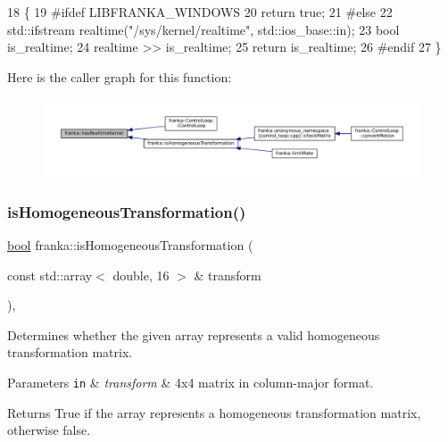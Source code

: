 \begin{DoxyCode}
18                          \{
19 \textcolor{preprocessor}{#ifdef LIBFRANKA\_WINDOWS}
20   \textcolor{keywordflow}{return} \textcolor{keyword}{true};
21 \textcolor{preprocessor}{#else}
22   std::ifstream realtime(\textcolor{stringliteral}{"/sys/kernel/realtime"}, std::ios\_base::in);
23   \textcolor{keywordtype}{bool} is\_realtime;
24   realtime >> is\_realtime;
25   \textcolor{keywordflow}{return} is\_realtime;
26 \textcolor{preprocessor}{#endif}
27 \}
\end{DoxyCode}
Here is the caller graph for this function\+:
\nopagebreak
\begin{figure}[H]
\begin{center}
\leavevmode
\includegraphics[width=350pt]{namespacefranka_ad165a74da105c78586c0cd4c1ed57bd2_icgraph}
\end{center}
\end{figure}
\mbox{\label{namespacefranka_ad81c99e8af3f2536ae3c6ec1ce8dce1e}} 
\subsubsection{\texorpdfstring{is\+Homogeneous\+Transformation()}{isHomogeneousTransformation()}}
{\footnotesize\ttfamily \hyperlink{classbool}{bool} franka\+::is\+Homogeneous\+Transformation (\begin{DoxyParamCaption}\item[{const std\+::array$<$ double, 16 $>$ \&}]{transform }\end{DoxyParamCaption})\hspace{0.3cm}{\ttfamily [inline]}, {\ttfamily [noexcept]}}

Determines whether the given array represents a valid homogeneous transformation matrix.


\begin{DoxyParams}[1]{Parameters}
\mbox{\tt in}  & {\em transform} & 4x4 matrix in column-\/major format.\\
\hline
\end{DoxyParams}
\begin{DoxyReturn}{Returns}
True if the array represents a homogeneous transformation matrix, otherwise false. 
\end{DoxyReturn}


